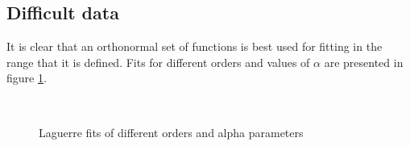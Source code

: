 \documentclass[a4paper]{article}
\numberwithin{equation}{section}
\begin{document}
\subsection{Difficult data}
It is clear that an orthonormal set of functions is best used for fitting in the range that it is defined. Fits for different orders and values of $\alpha$ are presented in figure \ref{fig:difficultfits}.

\begin{figure}[!ht]
  \centering
  \quad
  \\
  \quad
  \caption{Laguerre fits of different orders and alpha parameters}
  \label{fig:difficultfits}
\end{figure}
\end{document}
